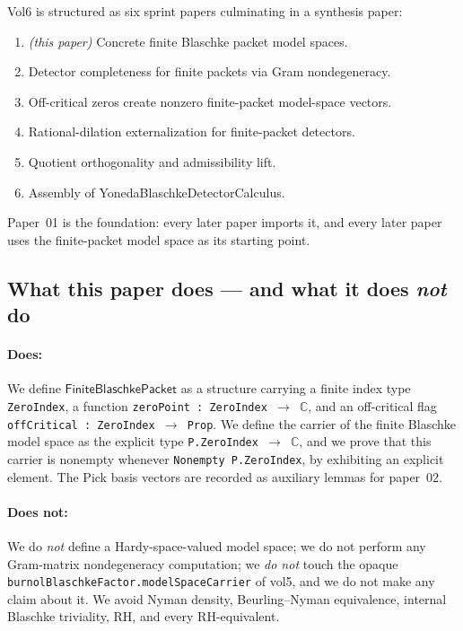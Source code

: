 \documentclass[11pt]{article}
\theoremstyle{plain}
\theoremstyle{definition}
\theoremstyle{remark}
\newcommand{\C}{\mathbb{C}}
\newcommand{\FiniteBlaschkePacket}{\textsf{FiniteBlaschkePacket}}
\newcommand{\code}[1]{\texttt{#1}}
\begin{document}
Vol6 is structured as six sprint papers culminating in a synthesis paper:
\begin{enumerate}[label=Paper~0\arabic*., leftmargin=*]
  \item \emph{(this paper)} Concrete finite Blaschke packet model spaces.
  \item Detector completeness for finite packets via Gram nondegeneracy.
  \item Off-critical zeros create nonzero finite-packet model-space vectors.
  \item Rational-dilation externalization for finite-packet detectors.
  \item Quotient orthogonality and admissibility lift.
  \item Assembly of \textsf{YonedaBlaschkeDetectorCalculus}.
\end{enumerate}
Paper~01 is the foundation: every later paper imports it, and every later
paper uses the finite-packet model space as its starting point.

\subsection{What this paper does --- and what it does \emph{not} do}

\paragraph{Does:}  We define $\FiniteBlaschkePacket$ as a structure carrying
a finite index type \code{ZeroIndex}, a function
\code{zeroPoint : ZeroIndex \(\to\) \(\C\)}, and an off-critical flag
\code{offCritical : ZeroIndex \(\to\) Prop}.  We define the carrier of the
finite Blaschke model space as the explicit type
\code{P.ZeroIndex \(\to\) \(\C\)}, and we prove that this carrier is nonempty
whenever \code{Nonempty P.ZeroIndex}, by exhibiting an explicit element.
The Pick basis vectors are recorded as auxiliary lemmas for paper~02.

\paragraph{Does not:}  We do \emph{not} define a Hardy-space-valued model
space; we do not perform any Gram-matrix nondegeneracy computation; we
\emph{do not} touch the opaque \code{burnolBlaschkeFactor.modelSpaceCarrier}
of vol5, and we do not make any claim about it.  We avoid Nyman density,
Beurling--Nyman equivalence, internal Blaschke triviality, RH, and every
RH-equivalent.
\end{document}
